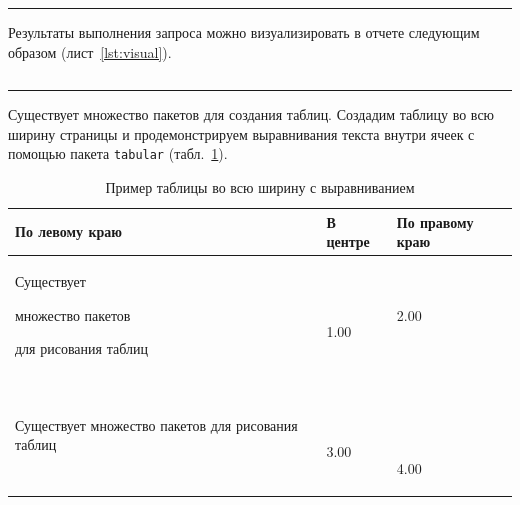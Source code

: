 \documentclass[14pt]{extarticle}
\begin{document}
\noindent\textcolor{red}{\rule{\textwidth}{2pt}}

Результаты выполнения запроса можно визуализировать в отчете следующим образом (лист~\ref{lst:visual}).

\begin{listing}[!htpb]
  \caption{Пример результата запроса\label{lst:visual}}
  \inputminted[xleftmargin=0cm, linenos=false, numbersep=0pt, fontsize=\small]{text}{list/demoresult.txt}
\end{listing}

\noindent\textcolor{red}{\rule{\textwidth}{2pt}}

Существует множество пакетов для создания таблиц. Создадим таблицу во всю ширину страницы и продемонстрируем выравнивания текста внутри ячеек с помощью пакета \texttt{tabular} (табл.~\ref{t:tab2}).

\newlength\q%
\setlength{}
\begin{table}[!htpb]
	\centering
	\caption{Пример таблицы во всю ширину с выравниванием\label{t:tab2}}
	\begin{tabular}{|p{\q}|p{\q}|p{\q}|} %
		\hline
		По левому краю \hfill & \hfil В центре & \hfill По правому краю \\
		\hline
		Существует\par множество пакетов\par для рисования таблиц & ~\par\hfil 1.00 & \hfil 2.00 \\
		\hline
		Существует множество пакетов для рисования таблиц & ~\par\hfil 3.00 & ~\par~\par\hfil 4.00 \\
		\hline
	\end{tabular}
\end{table}
\end{document}
